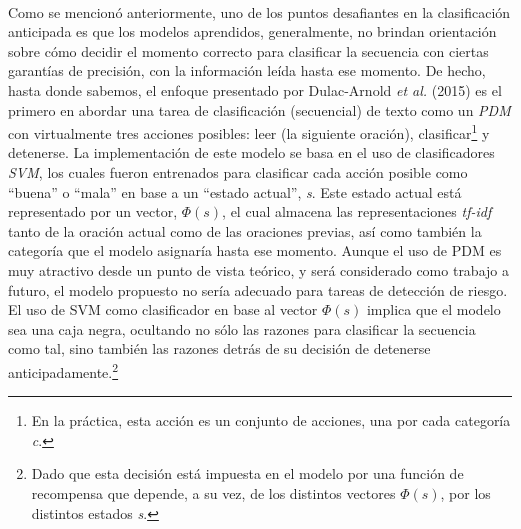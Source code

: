 \

Como se mencionó anteriormente, uno de los puntos desafiantes en la clasificación anticipada es que los modelos aprendidos, generalmente, no brindan orientación sobre cómo decidir el momento correcto para clasificar la secuencia con ciertas garantías de precisión, con la información leída hasta ese momento. 
De hecho, hasta donde sabemos, el enfoque presentado por Dulac-Arnold \emph{et al.} (2015) \cite{dulac2011text} es el primero en abordar una tarea de clasificación (secuencial) de texto como un \emph{\ac{PDM}} con virtualmente tres acciones posibles: leer (la siguiente oración), clasificar\footnote{En la práctica, esta acción es un conjunto de acciones, una por cada categoría \emph{c}.} y detenerse.
La implementación de este modelo se basa en el uso de clasificadores \emph{\ac{SVM}}, los cuales fueron entrenados para clasificar cada acción posible como ``buena'' o ``mala'' en base a un ``estado actual'', \emph{s}.
Este estado actual está representado por un vector, $\Phi(s)$, el cual almacena las representaciones \emph{tf-idf} tanto de la oración actual como de las oraciones previas, así como también la categoría que el modelo asignaría hasta ese momento.
Aunque el uso de \ac{PDM} es muy atractivo desde un punto de vista teórico, y será considerado como trabajo a futuro, el modelo propuesto no sería adecuado para tareas de detección de riesgo.
El uso de \ac{SVM} como clasificador en base al vector $\Phi(s)$ implica que el modelo sea una caja negra, ocultando no sólo las razones para clasificar la secuencia como tal, sino también las razones detrás de su decisión de detenerse anticipadamente.\footnote{Dado que esta decisión está impuesta en el modelo por una función de recompensa que depende, a su vez, de los distintos vectores $\Phi(s)$, por los distintos estados \emph{s}.}

